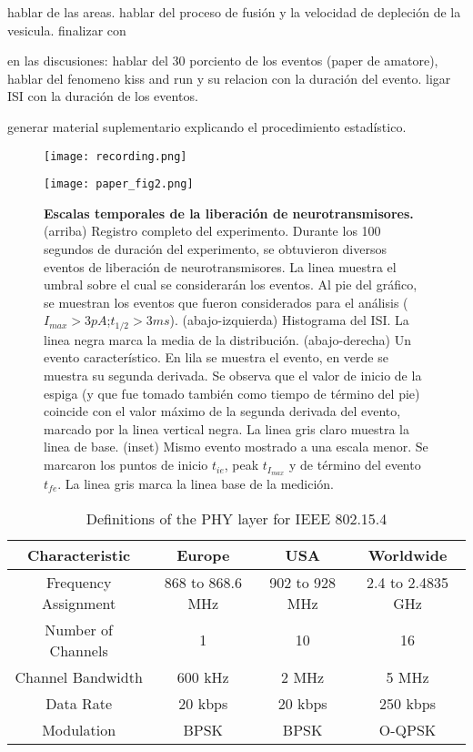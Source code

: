 \documentclass[twocolumn]{article}
\begin{document}
hablar de las areas.  hablar del proceso de fusión y la velocidad de depleción de la vesicula.
finalizar con 

en las discusiones: hablar del 30 porciento de los eventos (paper de amatore), hablar del fenomeno kiss and run y su relacion con la duración del evento. ligar ISI con la duración de los eventos.

generar material suplementario explicando el procedimiento estadístico.


\begin{figure*}[h!]
\centering
\texttt{[image: recording.png]} 
\end{figure*}
\begin{figure*}[h!]
\centering
\texttt{[image: paper\_fig2.png]} 
\caption{{\bf Escalas temporales de la liberación de neurotransmisores.} (arriba) Registro completo del experimento. Durante los 100 segundos de duración del experimento, se obtuvieron diversos eventos de liberación de neurotransmisores.  La linea muestra el umbral sobre el cual se considerarán los eventos.  Al pie del gráfico, se muestran los eventos que fueron considerados para el análisis ($I_{max}>3pA$;$t_{1/2}>3ms$).
(abajo-izquierda) Histograma del ISI. La linea negra marca la media de la distribución. (abajo-derecha) Un evento característico.  En lila se muestra el evento, en verde se muestra su segunda derivada.  Se observa que el valor de inicio de la espiga (y que fue tomado también como tiempo de término del pie) coincide con el valor máximo de la segunda derivada del evento, marcado por la linea vertical negra.  La linea gris claro muestra la linea de base. (inset) Mismo evento mostrado a una escala menor.  Se marcaron los puntos de inicio $t_{ie}$, peak $t_{I_{max}}$ y de término del evento $t_{fe}$. La linea gris marca la linea base de la medición.}    
\label{fig:figura1}
\end{figure*}


\begin{table*}
\label{tab:ieee}
  \centering
	\begin{tabular}{ | c | c | c | c | }
	  \hline
	  Characteristic & Europe & USA & Worldwide \\
	  \hline
	  Frequency Assignment & 868 to 868.6 MHz & 902 to 928 MHz & 2.4 to 2.4835 GHz\\
	  \hline
	  Number of Channels & 1 & 10 & 16\\
	  \hline
	  Channel Bandwidth & 600 kHz & 2 MHz & 5 MHz\\
	  \hline
	  Data Rate & 20 kbps & 20 kbps & 250 kbps\\
	  \hline
	  Modulation & BPSK & BPSK & O-QPSK\\
	  \hline
	\end{tabular}
	\caption{Definitions of the PHY layer for IEEE 802.15.4}
\end{table*}
\end{document}

